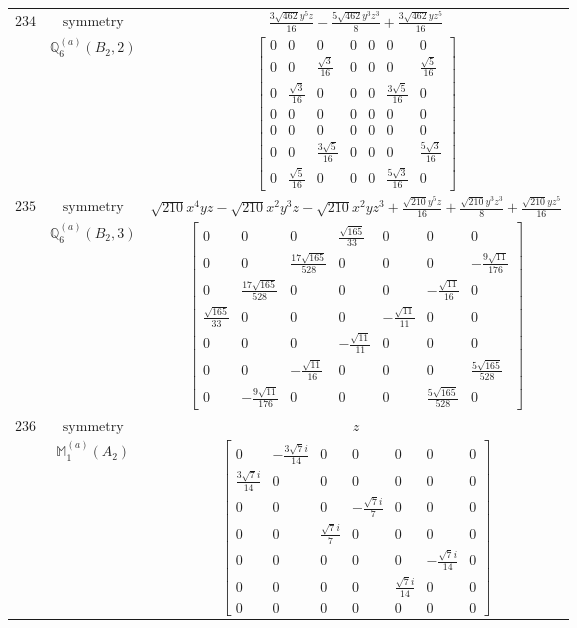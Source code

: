 \documentclass[fleqn,8pt,landscape]{jsarticle}
\begin{document}
\begin{longtable}{ccc}
$ 234 $ & $ \text{symmetry} $ & $ \frac{3 \sqrt{462} y^{5} z}{16} - \frac{5 \sqrt{462} y^{3} z^{3}}{8} + \frac{3 \sqrt{462} y z^{5}}{16} $ \\
$  $ & $ \mathbb{Q}_{6}^{(a)}(B_{2},2) $ & $ \begin{bmatrix} 0 & 0 & 0 & 0 & 0 & 0 & 0 \\ 0 & 0 & \frac{\sqrt{3}}{16} & 0 & 0 & 0 & \frac{\sqrt{5}}{16} \\ 0 & \frac{\sqrt{3}}{16} & 0 & 0 & 0 & \frac{3 \sqrt{5}}{16} & 0 \\ 0 & 0 & 0 & 0 & 0 & 0 & 0 \\ 0 & 0 & 0 & 0 & 0 & 0 & 0 \\ 0 & 0 & \frac{3 \sqrt{5}}{16} & 0 & 0 & 0 & \frac{5 \sqrt{3}}{16} \\ 0 & \frac{\sqrt{5}}{16} & 0 & 0 & 0 & \frac{5 \sqrt{3}}{16} & 0 \end{bmatrix} $ \\ \hline
$ 235 $ & $ \text{symmetry} $ & $ \sqrt{210} x^{4} y z - \sqrt{210} x^{2} y^{3} z - \sqrt{210} x^{2} y z^{3} + \frac{\sqrt{210} y^{5} z}{16} + \frac{\sqrt{210} y^{3} z^{3}}{8} + \frac{\sqrt{210} y z^{5}}{16} $ \\
$  $ & $ \mathbb{Q}_{6}^{(a)}(B_{2},3) $ & $ \begin{bmatrix} 0 & 0 & 0 & \frac{\sqrt{165}}{33} & 0 & 0 & 0 \\ 0 & 0 & \frac{17 \sqrt{165}}{528} & 0 & 0 & 0 & - \frac{9 \sqrt{11}}{176} \\ 0 & \frac{17 \sqrt{165}}{528} & 0 & 0 & 0 & - \frac{\sqrt{11}}{16} & 0 \\ \frac{\sqrt{165}}{33} & 0 & 0 & 0 & - \frac{\sqrt{11}}{11} & 0 & 0 \\ 0 & 0 & 0 & - \frac{\sqrt{11}}{11} & 0 & 0 & 0 \\ 0 & 0 & - \frac{\sqrt{11}}{16} & 0 & 0 & 0 & \frac{5 \sqrt{165}}{528} \\ 0 & - \frac{9 \sqrt{11}}{176} & 0 & 0 & 0 & \frac{5 \sqrt{165}}{528} & 0 \end{bmatrix} $ \\ \hline
$ 236 $ & $ \text{symmetry} $ & $ z $ \\
$  $ & $ \mathbb{M}_{1}^{(a)}(A_{2}) $ & $ \begin{bmatrix} 0 & - \frac{3 \sqrt{7} i}{14} & 0 & 0 & 0 & 0 & 0 \\ \frac{3 \sqrt{7} i}{14} & 0 & 0 & 0 & 0 & 0 & 0 \\ 0 & 0 & 0 & - \frac{\sqrt{7} i}{7} & 0 & 0 & 0 \\ 0 & 0 & \frac{\sqrt{7} i}{7} & 0 & 0 & 0 & 0 \\ 0 & 0 & 0 & 0 & 0 & - \frac{\sqrt{7} i}{14} & 0 \\ 0 & 0 & 0 & 0 & \frac{\sqrt{7} i}{14} & 0 & 0 \\ 0 & 0 & 0 & 0 & 0 & 0 & 0 \end{bmatrix} $ \\ \hline

\end{longtable}
\end{document}

